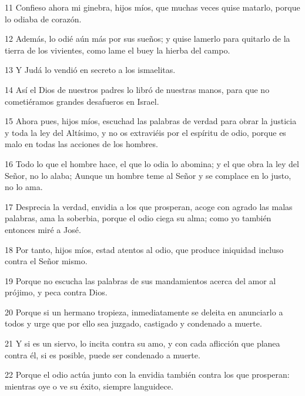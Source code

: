 \par 11 Confieso ahora mi ginebra, hijos míos, que muchas veces quise matarlo, porque lo odiaba de corazón.

\par 12 Además, lo odié aún más por sus sueños; y quise lamerlo para quitarlo de la tierra de los vivientes, como lame el buey la hierba del campo.

\par 13 Y Judá lo vendió en secreto a los ismaelitas.

\par 14 Así el Dios de nuestros padres lo libró de nuestras manos, para que no cometiéramos grandes desafueros en Israel.

\par 15 Ahora pues, hijos míos, escuchad las palabras de verdad para obrar la justicia y toda la ley del Altísimo, y no os extraviéis por el espíritu de odio, porque es malo en todas las acciones de los hombres.

\par 16 Todo lo que el hombre hace, el que lo odia lo abomina; y el que obra la ley del Señor, no lo alaba; Aunque un hombre teme al Señor y se complace en lo justo, no lo ama.

\par 17 Desprecia la verdad, envidia a los que prosperan, acoge con agrado las malas palabras, ama la soberbia, porque el odio ciega su alma; como yo también entonces miré a José.

\par 18 Por tanto, hijos míos, estad atentos al odio, que produce iniquidad incluso contra el Señor mismo.

\par 19 Porque no escucha las palabras de sus mandamientos acerca del amor al prójimo, y peca contra Dios.

\par 20 Porque si un hermano tropieza, inmediatamente se deleita en anunciarlo a todos y urge que por ello sea juzgado, castigado y condenado a muerte.

\par 21 Y si es un siervo, lo incita contra su amo, y con cada aflicción que planea contra él, si es posible, puede ser condenado a muerte.

\par 22 Porque el odio actúa junto con la envidia también contra los que prosperan: mientras oye o ve su éxito, siempre languidece.

